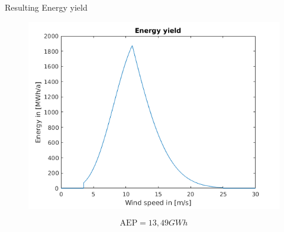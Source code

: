 \documentclass[12pt,t]{beamer}
\begin{document}
\begin{frame}
\huge
Resulting Energy yield
\begin{figure}[htbp]
\centering
\includegraphics[width=0.7\linewidth]{figures/energy_yield.png}
\end{figure}
\footnotesize
\begin{equation*}
\text{AEP} = 13,49 GWh
\end{equation*}

\end{frame}
\end{document}
